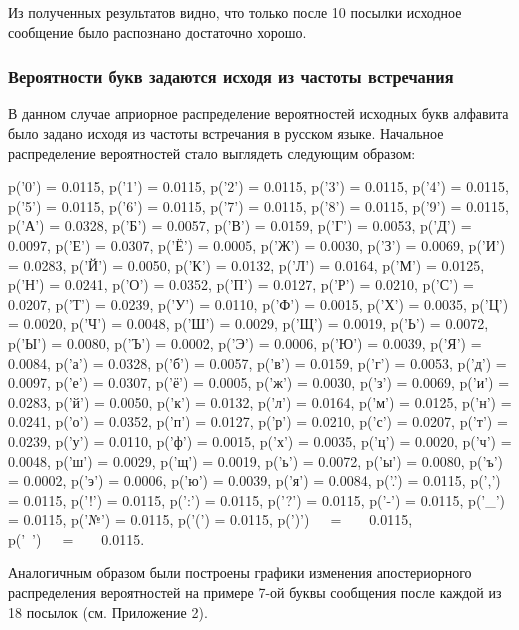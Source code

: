 Из полученных результатов видно, что только после 10 посылки исходное сообщение было распознано достаточно хорошо.

\subsubsection{Вероятности букв задаются исходя из частоты встречания}\label{sec:weghted}

В данном случае априорное распределение вероятностей исходных букв алфавита было задано исходя из частоты встречания в русском языке. Начальное распределение вероятностей стало выглядеть следующим образом:

{ \scriptsize

\begin{multicols}{6}
\noindent p('0') = 0.0115,	p('1') = 0.0115,	p('2') = 0.0115,	p('3') = 0.0115,	p('4') = 0.0115,	p('5') = 0.0115,	p('6') = 0.0115,	p('7') = 0.0115,	p('8') = 0.0115,	p('9') = 0.0115,	p('А') = 0.0328,	p('Б') = 0.0057,	p('В') = 0.0159,	p('Г') = 0.0053,	p('Д') = 0.0097,	p('Е') = 0.0307,	p('Ё') = 0.0005,	p('Ж') = 0.0030,	p('З') = 0.0069,	p('И') = 0.0283,	p('Й') = 0.0050,	p('К') = 0.0132,	p('Л') = 0.0164,	p('М') = 0.0125,	p('Н') = 0.0241,	p('О') = 0.0352,	p('П') = 0.0127,	p('Р') = 0.0210,	p('С') = 0.0207,	p('Т') = 0.0239,	p('У') = 0.0110,	p('Ф') = 0.0015,	p('Х') = 0.0035,	p('Ц') = 0.0020,	p('Ч') = 0.0048,	p('Ш') = 0.0029,	p('Щ') = 0.0019,	p('Ь') = 0.0072,	p('Ы') = 0.0080,	p('Ъ') = 0.0002,	p('Э') = 0.0006,	p('Ю') = 0.0039,	p('Я') = 0.0084,	p('а') = 0.0328,	p('б') = 0.0057,	p('в') = 0.0159,	p('г') = 0.0053,	p('д') = 0.0097,	p('е') = 0.0307,	p('ё') = 0.0005,	p('ж') = 0.0030,	p('з') = 0.0069,	p('и') = 0.0283,	p('й') = 0.0050,	p('к') = 0.0132,	p('л') = 0.0164,	p('м') = 0.0125,	p('н') = 0.0241,	p('о') = 0.0352,	p('п') = 0.0127,	p('р') = 0.0210,	p('с') = 0.0207,	p('т') = 0.0239,	p('у') = 0.0110,	p('ф') = 0.0015,	p('х') = 0.0035,	p('ц') = 0.0020,	p('ч') = 0.0048,	p('ш') = 0.0029,	p('щ') = 0.0019,	p('ь') = 0.0072,	p('ы') = 0.0080,	p('ъ') = 0.0002,	p('э') = 0.0006,	p('ю') = 0.0039,	p('я') = 0.0084,	p('.') = 0.0115,	p(',') = 0.0115,	p('!') = 0.0115,	p(':') = 0.0115,	p('?') = 0.0115,	p('-') = 0.0115,	p('\_') = 0.0115,	p('№') = 0.0115,	p('(') = 0.0115,	p(')')\ \ \ =\ \ \ \ 0.0115,\\	p('\ ')\ \ \ =\ \ \ \ 0.0115.
\end{multicols}

}
Аналогичным образом были построены графики изменения апостериорного распределения вероятностей на примере 7-ой буквы сообщения после каждой из 18 посылок (см. Приложение 2).

